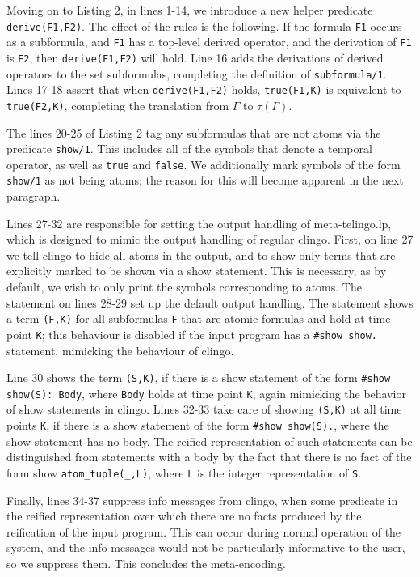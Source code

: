 Moving on to Listing 2, in lines 1-14, we introduce a new helper
predicate \verb|derive(F1,F2)|. The effect of the rules is the
following. If the formula \verb|F1| occurs as a subformula, and
\verb|F1| has a top-level derived operator, and the derivation of
\verb|F1| is \verb|F2|, then \verb|derive(F1,F2)| will hold. Line 16
adds the derivations of derived operators to the set subformulas,
completing the definition of \verb|subformula/1|. Lines 17-18 assert
that when \verb|derive(F1,F2)| holds, \verb|true(F1,K)| is equivalent
to \verb|true(F2,K)|, completing the translation from $\Gamma$ to
$\tau(\Gamma)$.

The lines 20-25 of Listing 2 tag any subformulas that are not atoms
via the predicate \verb|show/1|. This includes all of the symbols that
denote a temporal operator, as well as \verb|true| and
\verb|false|. We additionally mark symbols of the form \verb|show/1|
as not being atoms; the reason for this will become apparent in the
next paragraph.

Lines 27-32 are responsible for setting the output handling of
meta-telingo.lp, which is designed to mimic the output handling of
regular clingo. First, on line 27 we tell clingo to hide all atoms in
the output, and to show only terms that are explicitly marked to be
shown via a show statement. This is necessary, as by default, we wish
to only print the symbols corresponding to atoms. The statement on
lines 28-29 set up the default output handling. The statement shows a
term \verb|(F,K)| for all subformulas \verb|F| that are atomic
formulas and hold at time point \verb|K|; this behaviour is disabled
if the input program has a \verb|#show show.| statement, mimicking the
behaviour of clingo. 

Line 30 shows the term \verb|(S,K)|, if there is a show statement of
the form \verb|#show show(S): Body|, where \verb|Body| holds at time
point \verb|K|, again mimicking the behavior of show statements in
clingo. Lines 32-33 take care of showing \verb|(S,K)| at all time
points \verb|K|, if there is a show statement of the form
\verb|#show show(S).|, where the show statement has no body. The
reified representation of such statements can be distinguished from
statements with a body by the fact that there is no fact of the form
show \verb|atom_tuple(_,L)|, where \verb|L| is the integer
representation of \verb|S|.

Finally, lines 34-37 suppress info messages from clingo, when some
predicate in the reified representation over which there are no facts
produced by the reification of the input program. This can occur
during normal operation of the system, and the info messages would not
be particularly informative to the user, so we suppress them. This
concludes the meta-encoding.

